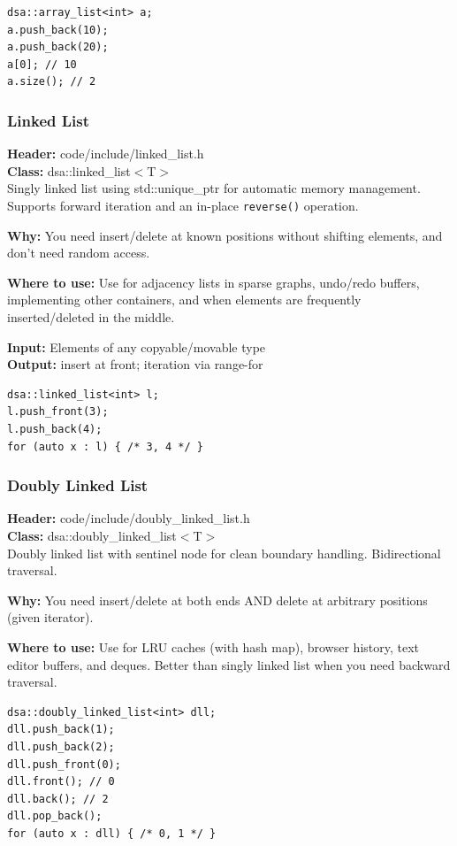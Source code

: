 \documentclass[11pt]{article}
\begin{document}
\begin{lstlisting}
dsa::array_list<int> a;
a.push_back(10);
a.push_back(20);
a[0]; // 10
a.size(); // 2
\end{lstlisting}

\subsubsection{Linked List}
\textbf{Header:} code/include/linked\_list.h\\
\textbf{Class:} dsa::linked\_list$<$T$>$\\

Singly linked list using std::unique\_ptr for automatic memory management. Supports forward iteration and an in-place \texttt{reverse()} operation.

\textbf{Why:} You need insert/delete at known positions without shifting elements, and don't need random access. \par \textbf{Where to use:} Use for adjacency lists in sparse graphs, undo/redo buffers, implementing other containers, and when elements are frequently inserted/deleted in the middle.

\textbf{Input:} Elements of any copyable/movable type\\
\textbf{Output:} insert at front; iteration via range-for

\begin{lstlisting}
dsa::linked_list<int> l;
l.push_front(3);
l.push_back(4);
for (auto x : l) { /* 3, 4 */ }
\end{lstlisting}

\subsubsection{Doubly Linked List}
\textbf{Header:} code/include/doubly\_linked\_list.h\\
\textbf{Class:} dsa::doubly\_linked\_list$<$T$>$\\

Doubly linked list with sentinel node for clean boundary handling. Bidirectional traversal.

\textbf{Why:} You need insert/delete at both ends AND delete at arbitrary positions (given iterator). \par \textbf{Where to use:} Use for LRU caches (with hash map), browser history, text editor buffers, and deques. Better than singly linked list when you need backward traversal.

\begin{lstlisting}
dsa::doubly_linked_list<int> dll;
dll.push_back(1);
dll.push_back(2);
dll.push_front(0);
dll.front(); // 0
dll.back(); // 2
dll.pop_back();
for (auto x : dll) { /* 0, 1 */ }
\end{lstlisting}
\end{document}

